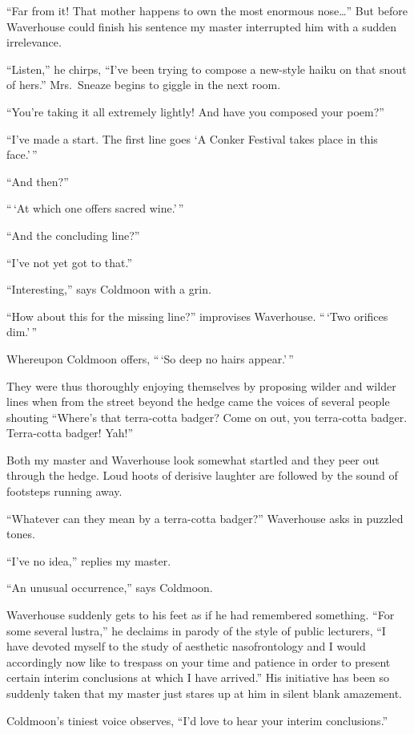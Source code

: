 \documentclass[12pt, openright]{book}
\begin{document}
``Far from it! That mother happens to own the most enormous
nose\ldots{}'' But before Waverhouse could finish his sentence my master
interrupted him with a sudden irrelevance.

``Listen,'' he chirps, ``I've been trying to compose a new-style haiku
on that snout of hers.'' Mrs.~Sneaze begins to giggle in the next room.

``You're taking it all extremely lightly! And have you composed your
poem?''

``I've made a start. The first line goes `A Conker Festival takes place
in this face.'\,''

``And then?''

``\,`At which one offers sacred wine.'\,''

``And the concluding line?''

``I've not yet got to that.''

``Interesting,'' says Coldmoon with a grin.

``How about this for the missing line?'' improvises Waverhouse. ``\,`Two
orifices dim.'\,''

Whereupon Coldmoon offers, ``\,`So deep no hairs appear.'\,''

They were thus thoroughly enjoying themselves by proposing wilder and
wilder lines when from the street beyond the hedge came the voices of
several people shouting ``Where's that terra-cotta badger? Come on out,
you terra-cotta badger. Terra-cotta badger! Yah!''

Both my master and Waverhouse look somewhat startled and they peer out
through the hedge. Loud hoots of derisive laughter are followed by the
sound of footsteps running away.

``Whatever can they mean by a terra-cotta badger?'' Waverhouse asks in
puzzled tones.

``I've no idea,'' replies my master.

``An unusual occurrence,'' says Coldmoon.

Waverhouse suddenly gets to his feet as if he had remembered something.
``For some several lustra,'' he declaims in parody of the style of
public lecturers, ``I have devoted myself to the study of aesthetic
nasofrontology and I would accordingly now like to trespass on your time
and patience in order to present certain interim conclusions at which I
have arrived.'' His initiative has been so suddenly taken that my master
just stares up at him in silent blank amazement.

Coldmoon's tiniest voice observes, ``I'd love to hear your interim
conclusions.''
\end{document}
